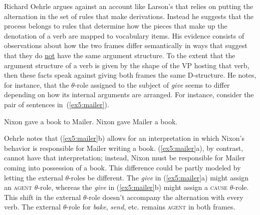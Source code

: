 Richard Oehrle\cite{Oehrle:1976} argues against an account like Larson's that relies on putting the alternation in the set of rules that make derivations. Instead he suggests that the process belongs to rules that determine how the pieces that make up the denotation of a verb are mapped to vocabulary items. His evidence consists of observations about how the two frames differ semantically in ways that suggest that they do \uline{not} have the same argument structure. To the extent that the argument structure of a verb is given by the shape of the VP hosting that verb, then these facts speak against giving both frames the same D-structure. He notes, for instance, that the $\theta$-role assigned to the subject of \emph{give} seems to differ depending on how its internal arguments are arranged. For instance, consider the pair of sentences in~(\ref{ex5:mailer}).
\begin{exe}
	\raggedright
	\ex \label{ex5:mailer} 
	\begin{xlist}
		\ex Nixon gave a book to Mailer.
		\ex Nixon gave Mailer a book.
	\end{xlist}
	\hspace*{\fill} \citep[section 1.1, p.~19]{Oehrle:1976} \hspace*{.5in}
\end{exe}
Oehrle notes that (\ref{ex5:mailer}b) allows for an interpretation in which Nixon's behavior is responsible for Mailer writing a book. (\ref{ex5:mailer}a), by contrast, cannot have that interpretation; instead, Nixon must be responsible for Mailer coming into possession of a book. This difference could be partly modeled by letting the external $\theta$-roles be different. The \emph{give} in (\ref{ex5:mailer}a) might assign an \textsc{agent} $\theta$-role, whereas the \emph{give} in (\ref{ex5:mailer}b) might assign a \textsc{cause} $\theta$-role. This shift in the external $\theta$-role doesn't accompany the alternation with every verb. The external $\theta$-role for \emph{bake}, \emph{send}, etc. remains \textsc{agent} in both frames. 

